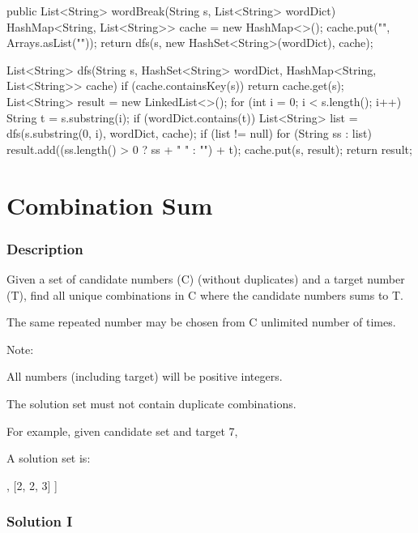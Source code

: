 \begin{Code}
public List<String> wordBreak(String s, List<String> wordDict) {
    HashMap<String, List<String>> cache = new HashMap<>();
    cache.put("", Arrays.asList(""));
    return dfs(s, new HashSet<String>(wordDict), cache);
}

List<String> dfs(String s, HashSet<String> wordDict, HashMap<String, List<String>> cache) {
    if (cache.containsKey(s)) {
        return cache.get(s);
    }
    List<String> result = new LinkedList<>();
    for (int i = 0; i < s.length(); i++) {
        String t = s.substring(i);
        if (wordDict.contains(t)) {
            List<String> list = dfs(s.substring(0, i), wordDict, cache);
            if (list != null) {
                for (String ss : list) {
                    result.add((ss.length() > 0 ? ss + " " : "") + t);
                }
            }
        }
    }
    cache.put(s, result);
    return result;
}
\end{Code}

\newpage

\section{Combination Sum} %

\subsubsection{Description}

Given a set of candidate numbers (C) (without duplicates) and a target number (T), find all unique combinations in C where the candidate numbers sums to T.

The same repeated number may be chosen from C unlimited number of times.

Note:

All numbers (including target) will be positive integers.

The solution set must not contain duplicate combinations.

For example, given candidate set \code{[2, 3, 6, 7]} and target 7,

A solution set is:
\begin{code}
[
  [7],
  [2, 2, 3]
]
\end{code}

\subsubsection{Solution I}

